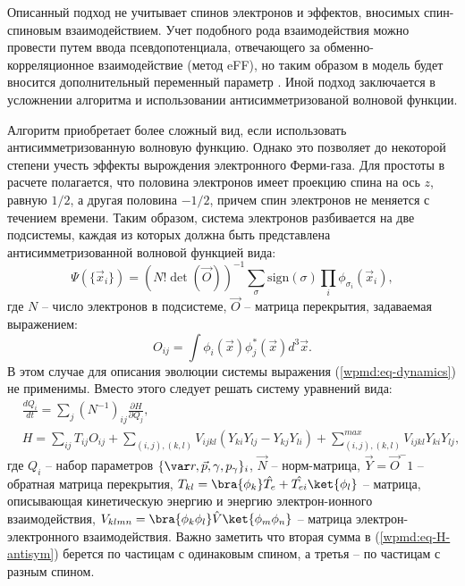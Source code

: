Описанный подход не учитывает спинов электронов и эффектов, вносимых спин-спиновым взаимодействием. Учет подобного рода взаимодействия можно провести путем ввода псевдопотенциала, отвечающего за обменно-корреляционное взаимодействие (метод eFF), но таким образом в модель будет вносится дополнительный переменный параметр \cite{su2007excited}. Иной подход заключается в усложнении алгоритма и использовании антисимметризованой волновой функции. 

Алгоритм приобретает более сложный вид, если использовать антисимметризованную волновую функцию. Однако это позволяет до некоторой степени учесть эффекты вырождения электронного Ферми-газа. Для простоты в расчете полагается, что половина электронов имеет проекцию спина на ось $z$, равную $1/2$, а другая половина
$-1/2$, причем спин электронов не меняется с течением времени. Таким образом, система электронов разбивается на две подсистемы, каждая из которых должна быть представлена
антисимметризованной волновой функцией вида:
\begin{equation}
	\label{wpmd:eq-psi-antisim}
	\Psi(\{\vec x_i\}) = (N! \det(\vec O))^{-1} \sum_\sigma \mathrm{sign}(\sigma) \prod_i \phi_{\sigma_i}(\vec x_i),
\end{equation}
где $N$ -- число электронов в подсистеме, $\vec O$ -- матрица перекрытия, задаваемая выражением:
\begin{equation}
	\label{wpmd:eq-overlap}
	O_{ij}=\int \phi_i(\vec x)\phi_j^*(\vec x)d^3\vec x .
\end{equation}
В этом случае для описания эволюции системы выражения (\ref{wpmd:eq-dynamics}) не применимы. Вместо этого следует решать систему уравнений вида:
\begin{align}
	\label{wpmd:eq-dynamic-antisym}
	&\frac{dQ_i}{dt} = \sum_j (N^{-1})_{ij} \frac{\partial H}{\partial Q_j}, \\
	&\label{wpmd:eq-H-antisym} H = \sum _{ij} T_{ij} O_{ij} + \sum_{(i,j), (k,l)} V_{ijkl}(Y_{ki}Y_{lj} - Y_{kj}Y_{li}) + \sum_{(i,j), (k,l)}^{max} V_{ijkl}Y_{ki}Y_{lj},
\end{align}
где $Q_i$ -- набор параметров $\{ \var r, \vec p, \gamma, p_\gamma \}_i$, $\vec N$ -- норм-матрица, $\vec Y = \vec O^-1$ -- обратная матрица перекрытия, $T_{kl} = \bra{\phi_k} \hat{T_e} + \hat{T_{ei}} \ket{\phi_l}$ -- матрица, описывающая кинетическую энергию и энергию электрон-ионного  взаимодействия, $V_{klmn}=\bra{\phi_k\phi_l}\hat{V}\ket{\phi_m\phi_n}$ -- матрица электрон-электронного взаимодействия. Важно заметить что вторая сумма в (\ref{wpmd:eq-H-antisym}) берется по частицам с одинаковым спином, а третья -- по частицам с разным спином. 


